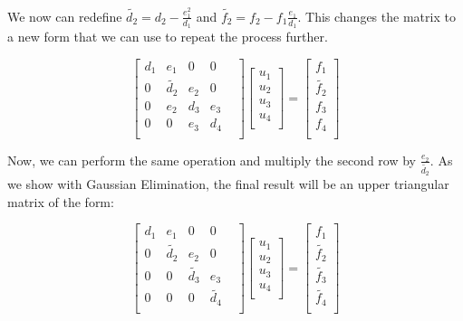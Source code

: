\documentclass{article}
\begin{document}
We now can redefine $\tilde{d_{2}}= d_{2}-\frac{e_{1}^{2}}{d_{1}}$ and $\tilde{f_{2}} = f_{2} - f_{1} \frac{e_{1}}{d_{1}} $. This changes the matrix to a new form that we can use to repeat the process further.

\[
\begin{bmatrix}
d_{1}& e_{1}& 0& 0& \\
0& \tilde{d_{2}}& e_{2}& 0& \\
0& e_{2}& d_{3}& e_{3}& \\
0& 0& e_{3}& d_{4}& \\
\end{bmatrix}
\begin{bmatrix}
u_{1}\\
u_{2} \\
u_{3}\\
u_{4}\\
\end{bmatrix}
=
\begin{bmatrix}
f_{1}\\
\tilde{f_{2}}\\
f_{3}\\
f_{4}\\
\end{bmatrix}
\]

Now, we can perform the same operation and multiply the second row by $\frac{e_{2}}{\tilde{d_{2}}}$. As we show with Gaussian Elimination, the final result will be an upper triangular matrix of the form:

\[
\begin{bmatrix}
	d_{1}& e_{1}& 0& 0& \\
	0& \tilde{d_{2}}& e_{2}& 0& \\
	0& 0& \tilde{d_{3}}& e_{3}& \\
	0& 0& 0& \tilde{d_{4}}& \\
\end{bmatrix}
\begin{bmatrix}
	u_{1}\\
	u_{2} \\
	u_{3}\\
	u_{4}\\
\end{bmatrix}
=
\begin{bmatrix}
	f_{1}\\
	\tilde{f_{2}}\\
	\tilde{f_{3}}\\
	\tilde{f_{4}}\\
\end{bmatrix}
\]
\end{document}
